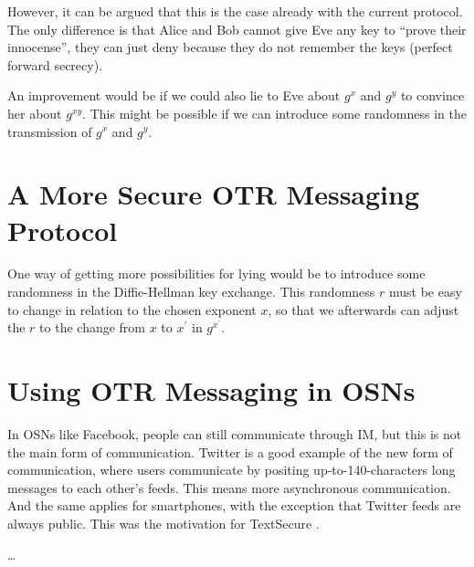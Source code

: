 However, it can be argued that this is the case already with the current 
protocol.
The only difference is that Alice and Bob cannot give Eve any key to 
\enquote{prove their innocense}, they can just deny because they do not 
remember the keys (perfect forward secrecy).

An improvement would be if we could also lie to Eve about \(g^x\) and \(g^y\) 
to convince her about \(g^{xy}\).
This might be possible if we can introduce some randomness in the transmission 
of \(g^x\) and \(g^y\).


\section{A More Secure \acs{OTR} Messaging Protocol}

One way of getting more possibilities for lying would be to introduce some 
randomness in the Diffie-Hellman key exchange.
This randomness \(r\) must be easy to change in relation to the chosen exponent 
\(x\), so that we afterwards can adjust the \(r\) to the change from \(x\) to 
\(x^\prime\) in \(g^{x^\prime}\).


\section{Using \acs{OTR} Messaging in \acsp{OSN}}

In \acp{OSN} like Facebook, people can still communicate through \ac{IM}, but 
this is not the main form of communication.
Twitter is a good example of the new form of communication, where users 
communicate by positing up-to-140-characters long messages to each other's 
feeds.
This means more asynchronous communication.
And the same applies for smartphones, with the exception that Twitter feeds are 
always public.
This was the motivation for TextSecure \cite{TSasynch}.

\dots


\printbibliography
